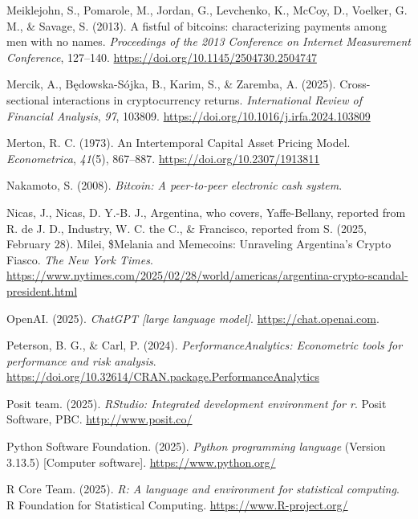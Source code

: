 \documentclass[
  12pt,
  a4paper,
  openany]{scrbook}
\newlength{\cslhangindent}
\newenvironment{CSLReferences}[2] %
 {\begin{list}{}{%
  \setlength{\itemindent}{0pt}
  \setlength{\leftmargin}{0pt}
  \setlength{\parsep}{0pt}
  \ifodd #1
   \setlength{\leftmargin}{\cslhangindent}
   \setlength{\itemindent}{-1\cslhangindent}
  \fi
  \setlength{\itemsep}{#2\baselineskip}}}
 {\end{list}}
\begin{document}
\begin{CSLReferences}{1}{0}
Meiklejohn, S., Pomarole, M., Jordan, G., Levchenko, K., McCoy, D.,
Voelker, G. M., \& Savage, S. (2013). A fistful of bitcoins:
characterizing payments among men with no names. \emph{Proceedings of
the 2013 Conference on Internet Measurement Conference}, 127--140.
\url{https://doi.org/10.1145/2504730.2504747}

Mercik, A., Będowska-Sójka, B., Karim, S., \& Zaremba, A. (2025).
Cross-sectional interactions in cryptocurrency returns.
\emph{International Review of Financial Analysis}, \emph{97}, 103809.
\url{https://doi.org/10.1016/j.irfa.2024.103809}

Merton, R. C. (1973). An Intertemporal Capital Asset Pricing Model.
\emph{Econometrica}, \emph{41}(5), 867--887.
\url{https://doi.org/10.2307/1913811}

Nakamoto, S. (2008). \emph{Bitcoin: A peer-to-peer electronic cash
system}.

Nicas, J., Nicas, D. Y.-B. J., Argentina, who covers, Yaffe-Bellany,
reported from R. de J. D., Industry, W. C. the C., \& Francisco,
reported from S. (2025, February 28). Milei, \$Melania and Memecoins:
Unraveling Argentina's Crypto Fiasco. \emph{The New York Times}.
\url{https://www.nytimes.com/2025/02/28/world/americas/argentina-crypto-scandal-president.html}

OpenAI. (2025). \emph{ChatGPT {[}large language model{]}}.
\url{https://chat.openai.com}.

Peterson, B. G., \& Carl, P. (2024). \emph{{PerformanceAnalytics}:
Econometric tools for performance and risk analysis}.
\url{https://doi.org/10.32614/CRAN.package.PerformanceAnalytics}

Posit team. (2025). \emph{{RStudio}: Integrated development environment
for r}. Posit Software, PBC. \url{http://www.posit.co/}

Python Software Foundation. (2025). \emph{Python programming language}
(Version 3.13.5) {[}Computer software{]}. \url{https://www.python.org/}

R Core Team. (2025). \emph{R: A language and environment for statistical
computing}. R Foundation for Statistical Computing.
\url{https://www.R-project.org/}


\end{CSLReferences}
\end{document}
